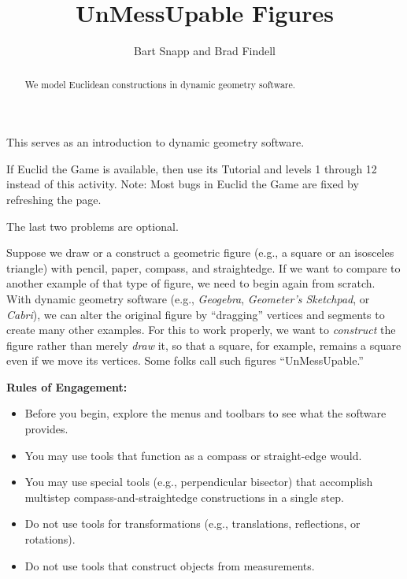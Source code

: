 \documentclass[nooutcomes]{ximera}
\title{UnMessUpable Figures}
\author{Bart Snapp and Brad Findell}
\begin{document}
\begin{abstract}
  We model Euclidean constructions in dynamic geometry software.
\end{abstract}
\maketitle

\begin{teachingnote}
This serves as an introduction to dynamic geometry software.  

If Euclid the Game is available, then use its Tutorial and levels 1 through 12 instead of this activity.  Note:  Most bugs in Euclid the Game are fixed by refreshing the page. 

The last two problems are optional.
\end{teachingnote}

 
Suppose we draw or a construct a geometric figure (e.g., a square or an isosceles triangle) with pencil, paper, compass, and straightedge.  If we want to compare to another example of that type of figure, we need to begin again from scratch.  With dynamic geometry software (e.g., \textsl{Geogebra}, \textsl{Geometer's Sketchpad}, or \textsl{Cabri}), we can alter the original figure by ``dragging'' vertices and segments to create many other examples.  For this to work properly, we want to \emph{construct} the figure rather than merely \emph{draw} it, so that a square, for example, remains a square even if we move its vertices.  Some folks call such figures ``UnMessUpable.'' 

\vspace{0.1in}
\begin{center}
\textbf{Rules of Engagement:}
\end{center}
\begin{itemize}
\itemsep0em
\item Before you begin, explore the menus and toolbars to see what the software provides.  
\item You may use tools that function as a compass or straight-edge would.  
\item You may use special tools (e.g., perpendicular bisector) that accomplish multistep     
compass-and-straightedge constructions in a single step.
\item Do not use tools for transformations (e.g., translations, reflections, or rotations).
\item Do not use tools that construct objects from measurements.  
\end{itemize}
\end{document}
